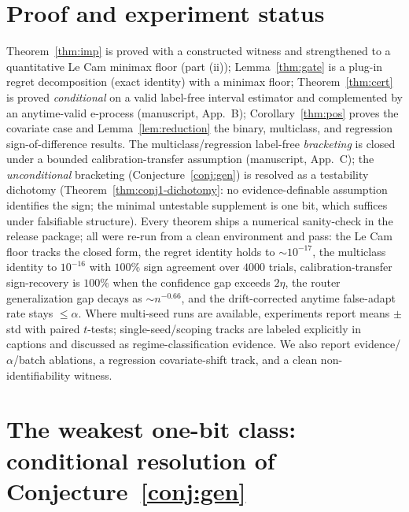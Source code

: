\documentclass[conference]{IEEEtran}
\theoremstyle{plain}
\theoremstyle{definition}
\begin{document}
\section{Proof and experiment status}\label{app:status}
Theorem~\ref{thm:imp} is proved with a constructed witness and strengthened to a quantitative Le
Cam minimax floor (part (ii)); Lemma~\ref{thm:gate} is a plug-in regret
decomposition (exact identity) with a minimax floor; Theorem~\ref{thm:cert} is proved
\emph{conditional} on a valid label-free interval estimator and complemented by an anytime-valid
e-process (manuscript, App.~B); Corollary~\ref{thm:pos} proves the covariate case and
Lemma~\ref{lem:reduction} the binary, multiclass, and regression
sign-of-difference results. The multiclass/regression label-free \emph{bracketing} is closed under
a bounded calibration-transfer assumption (manuscript, App.~C); the \emph{unconditional}
bracketing (Conjecture~\ref{conj:gen}) is resolved as a testability dichotomy
(Theorem~\ref{thm:conj1-dichotomy}: no evidence-definable assumption identifies the
sign; the minimal untestable supplement is one bit, which suffices under falsifiable
structure). Every theorem ships a
numerical sanity-check in the release package; all were re-run
from a clean environment and pass: the Le Cam floor tracks the closed form, the regret identity
holds to ${\sim}10^{-17}$, the multiclass identity to $10^{-16}$ with $100\%$ sign agreement over
$4000$ trials, calibration-transfer sign-recovery is $100\%$ when the confidence gap exceeds
$2\eta$, the router generalization gap decays as ${\sim}n^{-0.66}$, and the drift-corrected anytime
false-adapt rate stays $\le\alpha$. Where multi-seed runs are available, experiments report means
$\pm$ std with paired $t$-tests; single-seed/scoping tracks are labeled explicitly in captions and
discussed as regime-classification evidence. We also report evidence/$\alpha$/batch ablations, a
regression covariate-shift track, and a clean
non-identifiability witness.



\section{The weakest one-bit class: conditional resolution of Conjecture~\ref{conj:gen}}\label{app:weakest}



\end{document}
